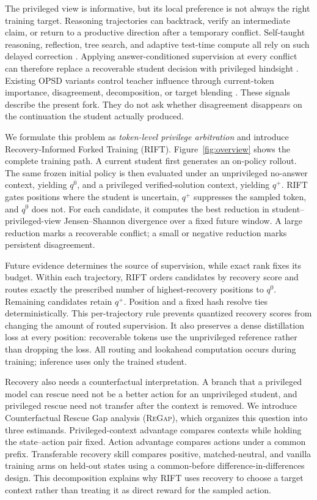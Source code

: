 \documentclass[letterpaper]{article}
\newcommand{\RIFT}{\textsc{RIFT}}
\newcommand{\ReGap}{\textsc{ReGap}}
\begin{document}
The privileged view is informative, but its local preference is not always the
right training target. Reasoning trajectories can backtrack, verify an
intermediate claim, or return to a productive direction after a temporary
conflict. Self-taught reasoning, reflection, tree search, and adaptive
test-time compute all rely on such delayed correction
\citep{zelikman2022star,shinn2023reflexion,yao2023tree,snell2024scaling}.
Applying answer-conditioned supervision at every conflict can therefore replace
a recoverable student decision with privileged hindsight
\citep{kaur2026rethinking,peng2026adopsd}. Existing OPSD variants control
teacher influence through current-token importance, disagreement, decomposition,
or target blending
\citep{xie2026position,shen2026purified,li2026phf,li2026demopsd}. These signals
describe the present fork. They do not ask whether disagreement disappears on
the continuation the student actually produced.

We formulate this problem as \emph{token-level privilege arbitration} and
introduce Recovery-Informed Forked Training (\RIFT). Figure~\ref{fig:overview}
shows the complete training path. A current student first generates an
on-policy rollout. The same frozen initial policy is then evaluated under an
unprivileged no-answer context, yielding $q^0$, and a privileged
verified-solution context, yielding $q^+$. \RIFT{} gates positions where the
student is uncertain, $q^+$ suppresses the sampled token, and $q^0$ does not.
For each candidate, it computes the best reduction in
student--privileged-view Jensen--Shannon divergence over a fixed future window.
A large reduction marks a recoverable conflict; a small or negative reduction
marks persistent disagreement.

Future evidence determines the source of supervision, while exact rank fixes
its budget. Within each trajectory, \RIFT{} orders candidates by recovery
score and routes exactly the prescribed number of highest-recovery positions
to $q^0$. Remaining candidates retain $q^+$. Position and a fixed hash resolve
ties deterministically. This per-trajectory rule prevents quantized recovery
scores from changing the amount of routed supervision. It also preserves a
dense distillation loss at every position: recoverable tokens use the
unprivileged reference rather than dropping the loss. All routing and lookahead
computation occurs during training; inference uses only the trained student.

Recovery also needs a counterfactual interpretation. A branch that a
privileged model can rescue need not be a better action for an unprivileged
student, and privileged rescue need not transfer after the context is removed.
We introduce Counterfactual Rescue Gap analysis (\ReGap), which organizes this
question into three estimands. Privileged-context advantage compares contexts
while holding the state--action pair fixed. Action advantage compares actions
under a common prefix. Transferable recovery skill compares positive,
matched-neutral, and vanilla training arms on held-out states using a
common-before difference-in-differences design. This decomposition explains why
\RIFT{} uses recovery to choose a target context rather than treating it as
direct reward for the sampled action.
\end{document}

